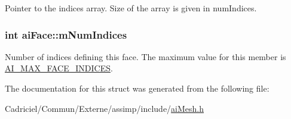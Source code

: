 Pointer to the indices array. Size of the array is given in num\-Indices. 

\hypertarget{structai_face_adda2698cec0ebfe651572f4a5701360b}{
\subsubsection[{m\-Num\-Indices}]{ {\bf int} ai\-Face\-::m\-Num\-Indices}}\label{structai_face_adda2698cec0ebfe651572f4a5701360b}
Number of indices defining this face. The maximum value for this member is \hyperlink{ai_mesh_8h_a380f3ab069e89b3a1ed975577600438b}{A\-I\-\_\-\-M\-A\-X\-\_\-\-F\-A\-C\-E\-\_\-\-I\-N\-D\-I\-C\-E\-S}. 

The documentation for this struct was generated from the following file\-:\begin{DoxyCompactItemize}
\item 
Cadriciel/\-Commun/\-Externe/assimp/include/\hyperlink{ai_mesh_8h}{ai\-Mesh.\-h}\end{DoxyCompactItemize}
